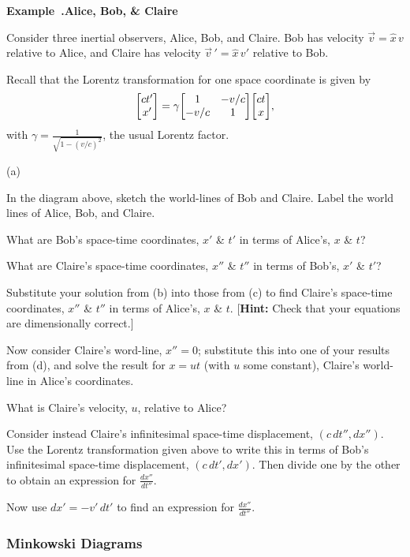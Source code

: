 \documentclass[12pt,oneside]{book}
\newcounter{example}[chapter]
\newenvironment{example}[2]{\noindent\refstepcounter{example}\par\medskip
	\noindent\textbf{Example~\thechapter.\theexample\quad #1} 
	\par\medskip\noindent#2
	\rmfamily}{\medskip}
\newcommand{\hint}[1]{{[{\bf Hint:} #1]}}
\begin{document}
\begin{example}{Alice, Bob, \& Claire}
{\label{ex:AliceBobClaire}%
Consider three inertial observers, Alice, Bob, and Claire. Bob has velocity $\vec{v}=\hat{x}\, v$ relative to Alice, and Claire has velocity $\vec{v}\,'=\hat{x}\, v'$ relative to Bob. 

Recall that the Lorentz transformation for one space coordinate is given by
$$
	\mqty[ ct' \\ x' ] 
	=
	\gamma
	\mqty[ 1 & -v/c \\ -v/c & 1 ]
	\mqty[ ct \\ x ],
$$
with $\gamma = \frac{1}{\sqrt{1-(v/c)^2}}$, the usual Lorentz factor.}%
\begin{inparaenum}{(a)}
\item
In the diagram above, sketch the world-lines of Bob and Claire. Label the world lines of Alice, Bob, and Claire.
\item
What are Bob's space-time coordinates, $x'$ \& $t'$ in terms of Alice's, $x$ \& $t$?
\item
What are Claire's space-time coordinates, $x''$ \& $t''$ in terms of Bob's, $x'$ \& $t'$?
\item
Substitute your solution from (b) into those from (c) to find Claire's space-time coordinates, 
$x''$ \& $t''$ in terms of Alice's, $x$ \& $t$.
\hint{Check that your equations are dimensionally correct.}
\item
Now consider Claire's word-line, $x''=0$; substitute this into one of your results from (d), and solve the result for $x=ut$ (with $u$ some constant), Claire's world-line in Alice's coordinates.
\item
What is Claire's velocity, $u$, relative to Alice?
\item
Consider instead Claire's infinitesimal space-time displacement, $(c\,dt'', dx'')$. Use the Lorentz transformation given above to write this in terms of Bob's infinitesimal space-time displacement, $(c\,dt', dx')$. Then divide one by the other to obtain an expression for $\frac{dx''}{dt''}$.
\item
Now use $dx' = -v'\,dt'$ to find an expression for $\frac{dx''}{dt''}$.
\end{inparaenum}
\end{example}

\subsubsection{Minkowski Diagrams}
\end{document}
